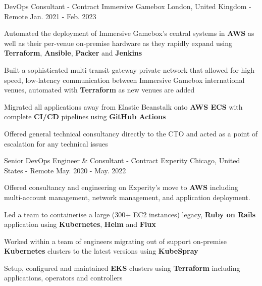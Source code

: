 
\begin{cventries}

  \cventry
    {DevOps Consultant - Contract} %
    {Immersive Gamebox} %
    {London, United Kingdom - Remote} %
    {Jan. 2021 - Feb. 2023} %
    {
      \begin{cvitems} %
        \item {Automated the deployment of Immersive Gamebox’s central systems in \textbf{AWS} as well as their per-venue on-premise hardware as they rapidly expand using \textbf{Terraform}, \textbf{Ansible}, \textbf{Packer} and \textbf{Jenkins}}
        \item {Built a sophisticated multi-transit gateway private network that allowed for high-speed, low-latency communication between Immersive Gamebox international venues, automated with \textbf{Terraform} as new venues are added}
        \item {Migrated all applications away from Elastic Beanstalk onto \textbf{AWS ECS} with complete \textbf{CI/CD} pipelines using \textbf{GitHub Actions}}
        \item {Offered general technical consultancy directly to the CTO and acted as a point of escalation for any technical issues}
      \end{cvitems}
    }

  \cventry
    {Senior DevOps Engineer \& Consultant - Contract} %
    {Experity} %
    {Chicago, United States - Remote} %
    {May. 2020 - May. 2022} %
    {
      \begin{cvitems} %
        \item {Offered consultancy and engineering on Experity's move to \textbf{AWS} including multi-account management, network management, and application deployment.}
        \item {Led a team to containerise a large (300+ EC2 instances) legacy, \textbf{Ruby on Rails} application using \textbf{Kubernetes}, \textbf{Helm} and \textbf{Flux}}
        \item {Worked within a team of engineers migrating out of support on-premise \textbf{Kubernetes} clusters to the latest versions using \textbf{KubeSpray}}
        \item {Setup, configured and maintained \textbf{EKS} clusters using \textbf{Terraform} including applications, operators and controllers}
      \end{cvitems}
    }


\end{cventries}
